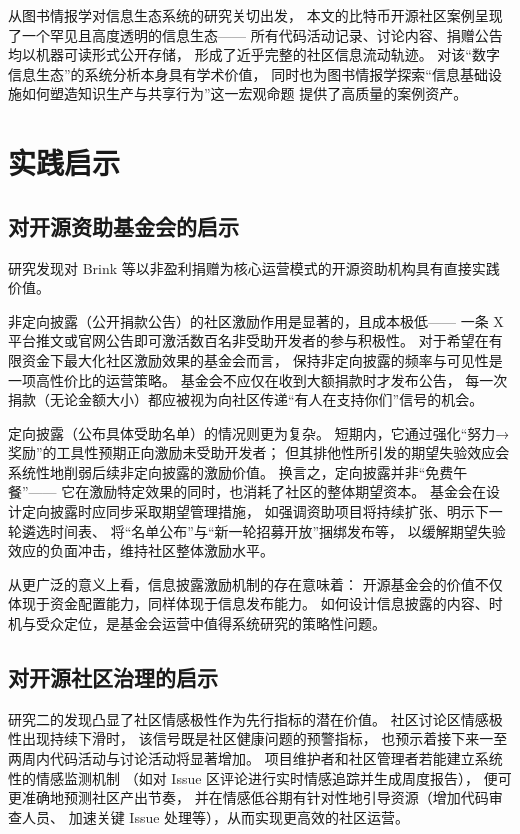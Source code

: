 \documentclass[
    type = master, %
    degree = professional,        %
    decl-page,  %
    twoside,                %
    fontset = fandol %
  ]{njuthesis}
\begin{document}
从图书情报学对信息生态系统的研究关切出发，
本文的比特币开源社区案例呈现了一个罕见且高度透明的信息生态——
所有代码活动记录、讨论内容、捐赠公告均以机器可读形式公开存储，
形成了近乎完整的社区信息流动轨迹。
对该“数字信息生态”的系统分析本身具有学术价值，
同时也为图书情报学探索“信息基础设施如何塑造知识生产与共享行为”这一宏观命题
提供了高质量的案例资产\cite{alami2024sustainability}。


\section{实践启示}

\subsection{对开源资助基金会的启示}

研究发现对 Brink 等以非盈利捐赠为核心运营模式的开源资助机构具有直接实践价值。

非定向披露（公开捐款公告）的社区激励作用是显著的，且成本极低——
一条 X 平台推文或官网公告即可激活数百名非受助开发者的参与积极性。
对于希望在有限资金下最大化社区激励效果的基金会而言，
保持非定向披露的频率与可见性是一项高性价比的运营策略。
基金会不应仅在收到大额捐款时才发布公告，
每一次捐款（无论金额大小）都应被视为向社区传递“有人在支持你们”信号的机会。

定向披露（公布具体受助名单）的情况则更为复杂。
短期内，它通过强化“努力→奖励”的工具性预期正向激励未受助开发者；
但其排他性所引发的期望失验效应会系统性地削弱后续非定向披露的激励价值。
换言之，定向披露并非“免费午餐”——
它在激励特定效果的同时，也消耗了社区的整体期望资本。
基金会在设计定向披露时应同步采取期望管理措施，
如强调资助项目将持续扩张、明示下一轮遴选时间表、
将“名单公布”与“新一轮招募开放”捆绑发布等，
以缓解期望失验效应的负面冲击，维持社区整体激励水平。

从更广泛的意义上看，信息披露激励机制的存在意味着：
开源基金会的价值不仅体现于资金配置能力，同样体现于信息发布能力。
如何设计信息披露的内容、时机与受众定位，是基金会运营中值得系统研究的策略性问题。

\subsection{对开源社区治理的启示}

研究二的发现凸显了社区情感极性作为先行指标的潜在价值。
社区讨论区情感极性出现持续下滑时，
该信号既是社区健康问题的预警指标，
也预示着接下来一至两周内代码活动与讨论活动将显著增加。
项目维护者和社区管理者若能建立系统性的情感监测机制
（如对 Issue 区评论进行实时情感追踪并生成周度报告），
便可更准确地预测社区产出节奏，
并在情感低谷期有针对性地引导资源（增加代码审查人员、
加速关键 Issue 处理等），从而实现更高效的社区运营。
\end{document}
